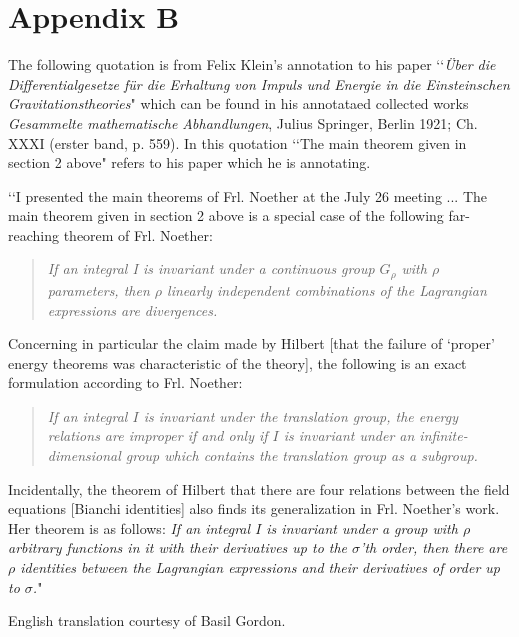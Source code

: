 \documentclass[12pt]{article}
\begin{document}
\section*{Appendix B}

\noindent
The following quotation is from Felix Klein's annotation to his paper \lq\lq{\it{\"{U}ber die Differentialgesetze f\"{u}r
die Erhaltung von Impuls und Energie in die Einsteinschen
Gravitationstheories}}" \cite{kleinpap} which can be found in his
annotataed collected works 
 {\it{Gesammelte mathematische Abhandlungen}}, Julius Springer, Berlin 1921;
Ch. XXXI (erster band, p. 559).  In this quotation 
  \lq\lq The main theorem given in section 2 above" refers to his  paper which he is annotating.


\lq\lq I presented the main theorems of Frl.  Noether at the July 26 meeting ...
The main theorem given in section 2 above is a special case of the following
far-reaching theorem of Frl. Noether:
\begin{quote}
{\it{ If an integral I
is invariant under a continuous group $G_\rho$ with $\rho$ parameters, then
$\rho$ linearly independent combinations of the Lagrangian expressions are
divergences.}}   
\end{quote}
Concerning in particular the claim made by Hilbert
[that the failure of `proper' energy theorems was  characteristic
  of the theory], the following is an exact formulation
according to Frl.  Noether:  
\begin{quote}{\it{ If an integral $I$ is invariant under
the translation group, the energy relations are improper if and only if $I$ is
invariant under an infinite-dimensional group which contains the translation
group as a subgroup.  }} 
\end{quote}
Incidentally, the theorem of Hilbert that
there are four relations between the field equations 
[Bianchi identities]
also finds its
generalization in Frl.  Noether's work.  Her theorem is as follows:
{\it{ If an integral $I$ is invariant under a group with $\rho$
arbitrary functions in it with their derivatives up to the $\sigma$'th order,
then there are $\rho$ identities between the Lagrangian expressions and their
derivatives of order up to $\sigma$.}}" 

\noindent
English translation courtesy of Basil Gordon. 
\end{document}
